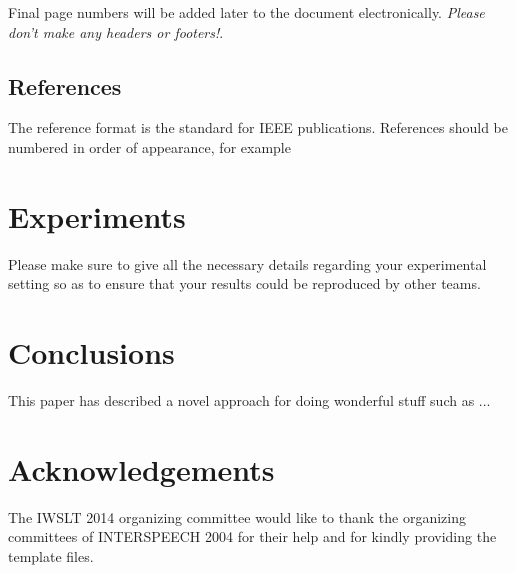 \documentclass[a4paper]{article}
\begin{document}
Final page numbers will be added later to the document
electronically. 
{\em Please don't make any headers or footers!}.

\subsection{References}

The reference format is the standard for IEEE publications.
References should be numbered in order of appearance, 
for example %

\section{Experiments}
Please make sure to give all the necessary details regarding your experimental 
setting so as to ensure that your results could be reproduced by other teams. 

\section{Conclusions}

This paper has described a novel approach for doing wonderful stuff such as ...

\section{Acknowledgements}
The IWSLT 2014 organizing committee would like to thank the
organizing committees of INTERSPEECH 2004 for their
help and for kindly providing the template files.



\end{document}
